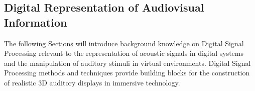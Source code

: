 
    


\subsection{Digital Representation of Audiovisual Information}
\label{sec:DSP-background}
The following Sections will introduce background knowledge on Digital Signal Processing relevant to the representation of acoustic signals in digital systems and the manipulation of auditory stimuli in virtual environments. Digital Signal Processing methods and techniques provide building blocks for the construction of realistic 3D auditory displays in immersive technology.

